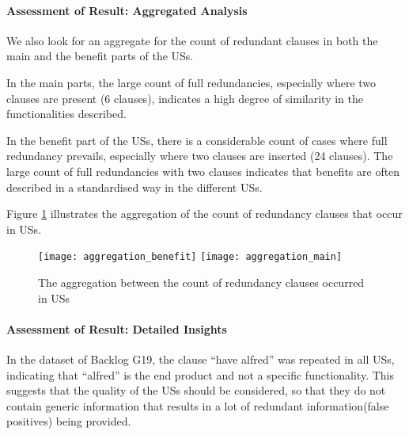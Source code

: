 \paragraph{Assessment of Result: Aggregated Analysis}We also look for an aggregate for the count of redundant clauses in both the main and the benefit parts of the USs. 

In the main parts, the large count of full redundancies, especially where two clauses are present (6 clauses), indicates a high degree of similarity in the functionalities described.

In the benefit part of the USs, there is a considerable count of cases where full redundancy prevails, especially where two clauses are inserted (24 clauses). The large count of full redundancies with two clauses indicates that benefits are often described in a standardised way in the different USs.

Figure \ref{fig:aggregation} illustrates the aggregation of the count of redundancy clauses that occur in USs.

\begin{figure}[h]
	\centering
	\texttt{[image: aggregation\_benefit]}
	\texttt{[image: aggregation\_main]}
	\caption{The aggregation between the count of redundancy clauses occurred in USs}\label{fig:aggregation}
\end{figure}
\paragraph{Assessment of Result: Detailed Insights}In the dataset of Backlog G19, the clause \enquote{have alfred} was repeated in all USs, indicating that \enquote{alfred} is the end product and not a specific functionality. This suggests that the quality of the USs should be considered, so that they do not contain generic information that results in a lot of redundant information(false positives) being provided.

